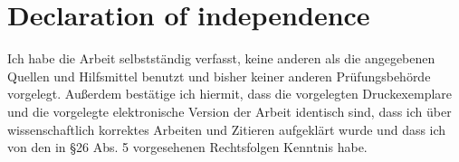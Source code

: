 \documentclass[12pt,twoside]{scrreport}
\begin{document}
\section*{Declaration of independence}
Ich habe die Arbeit selbstständig verfasst, keine anderen als die angegebenen Quellen und Hilfsmittel benutzt und bisher keiner anderen Prüfungsbehörde vorgelegt. Außerdem bestätige ich hiermit, dass die vorgelegten Druckexemplare und die vorgelegte elektronische Version der Arbeit identisch sind, dass ich über wissenschaftlich korrektes Arbeiten und Zitieren aufgeklärt wurde und dass ich von den in §26 Abs. 5 vorgesehenen Rechtsfolgen Kenntnis habe.

\end{document}
